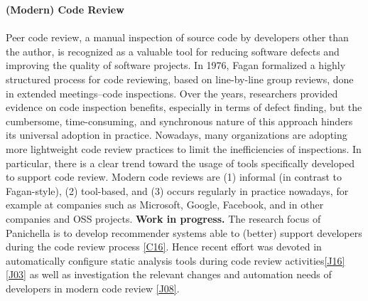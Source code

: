 \documentclass[10pt]{article}
\newcommand{\blankline}{\quad\pagebreak[3]}
\begin{document}
\textbf{(Modern) Code Review}
\blankline\\\\
Peer code review, a manual inspection of source code by developers other than the author, is recognized as a valuable tool for reducing software defects and improving the quality of software projects. In 1976, Fagan formalized a highly structured process for code reviewing, based on line-by-line group reviews, done in extended meetings--code inspections. Over the years, researchers provided evidence on code inspection benefits, especially in terms of defect finding, but the cumbersome, time-consuming, and synchronous nature of this approach hinders its universal adoption in practice. Nowadays, many organizations are adopting more lightweight code review practices to limit the inefficiencies of inspections. In particular, there is a clear trend toward the usage of tools specifically developed to support code review. Modern code reviews are (1) informal (in contrast to Fagan-style), (2) tool-based, and (3) occurs regularly in practice nowadays, for example at companies such as Microsoft, Google, Facebook, and in other companies and OSS projects. %
   \textbf{Work in progress.} The research focus of Panichella is to develop recommender systems able to (better) support developers during the code review process \ref{C16}. Hence recent effort was devoted in automatically configure static analysis tools during code review activities\ref{J16}\ref{J03} as well as investigation the relevant changes and automation needs of developers in modern code review \ref{J08}. 
   \\
\end{document}
